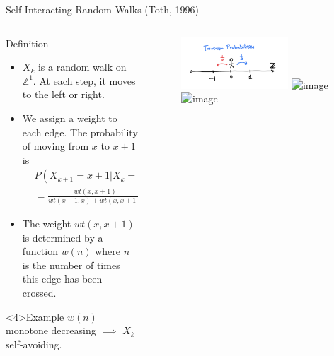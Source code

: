 \documentclass{if-beamer}
\begin{document}
\begin{frame}{Self-Interacting Random Walks (Toth, 1996)}

    \begin{columns}
        \begin{column}{0.6\textwidth}
            \begin{block}{Definition}
                \begin{itemize}
                    \item $X_k$ is a random walk on $\mathbb{Z}^1$. At each step, it moves to the left or right.
                    \item <2-> We assign a weight to each edge. 
                    The probability of moving from $x$ to $x+1$ is
                        \begin{align*}
                            &P(X_{k+1} = x+1 | X_k = x) \\
                            &= \frac{wt(x, x+1)}{wt(x-1 ,x) + wt(x, x+1)}
                        \end{align*}
                    \item <3-> The weight $wt(x, x+1)$ is determined by a function $w(n)$ where $n$ is the number of times this edge has been crossed.
                \end{itemize}
            \end{block}
            \begin{exampleblock}<4>{Example}
                $w(n)$ monotone decreasing $\implies$ $X_k$ self-avoiding.
            \end{exampleblock}
        \end{column}
        \begin{column}{0.5\textwidth}
            \begin{figure}
                \centering
                \includegraphics[width=0.7\textwidth]{figures/doodle-def1.png}
                \includegraphics<2->[width=0.7\textwidth]{figures/doodle-def2.png}
                \includegraphics<3->[width=0.7\textwidth]{figures/doodle-def3.png}
            \end{figure}
        \end{column}
    \end{columns}

\end{frame}
\end{document}
